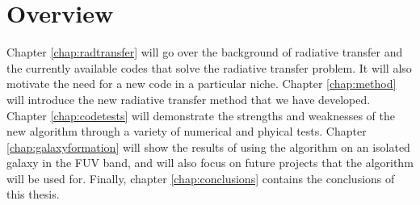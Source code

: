

%
%
%
%
% 
%
%
% 
%





\section{Overview}
\label{sec:overview}

Chapter \ref{chap:radtransfer} will go over the background of radiative transfer and the currently available codes that solve the radiative transfer problem. It will also motivate the need for a new code in a particular niche. Chapter \ref{chap:method} will introduce the new radiative transfer method that we have developed. Chapter \ref{chap:codetests} will demonstrate the strengths and weaknesses of the new algorithm through a variety of numerical and phyical tests. Chapter \ref{chap:galaxyformation} will show the results of using the algorithm on an isolated galaxy in the FUV band, and will also focus on future projects that the algorithm will be used for. Finally, chapter \ref{chap:conclusions} contains the conclusions of this thesis.

